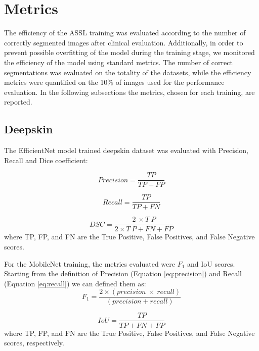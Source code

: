 \documentclass[../main.tex]{subfiles}
\begin{document}
\section{Metrics}

The efficiency of the ASSL training was evaluated according to the number of correctly segmented images after clinical evaluation.
Additionally, in order to prevent possible overfitting of the model during the training stage, we monitored the efficiency of the model using standard metrics.
The number of correct segmentations was evaluated on the totality of the datasets, while the efficiency metrics were quantified on the 10\% of images used for the performance evaluation.
In the following subsections the metrics, chosen for each training, are reported.

\subsection{Deepskin}


The EfficientNet model trained deepskin dataset was evaluated with Precision, Recall and Dice coefficient:

\begin{equation}\label{eq:precision}
    Precision=\frac{TP}{TP+FP}
\end{equation}

\begin{equation}\label{eq:recall}
    Recall=\frac{TP}{TP+FN}
\end{equation}

\begin{equation}\label{eq:dsc}
    DSC=\frac{2\ \times T\ P}{2\times T\ P+FN+FP}
\end{equation}
where TP, FP, and FN are the True Positive, False Positives, and False Negative scores.

For the MobileNet training, the metrics evaluated were $F_{1}$ and IoU scores.
Starting from the definition of Precision (Equation \ref{eq:precision}) and Recall (Equation \ref{eq:recall}) we can defined them as:
\begin{equation}\label{eq:f1}
   F_1=\frac{2\times\left(precision\ \times\ recall\right)}{\left(precision+recall\right)}
\end{equation}

\begin{equation}\label{eq:iou}
   IoU=\frac{TP}{TP+FN+FP}
\end{equation}
where TP, FP, and FN are the True Positive, False Positives, and False Negative scores, respectively.
\end{document}
